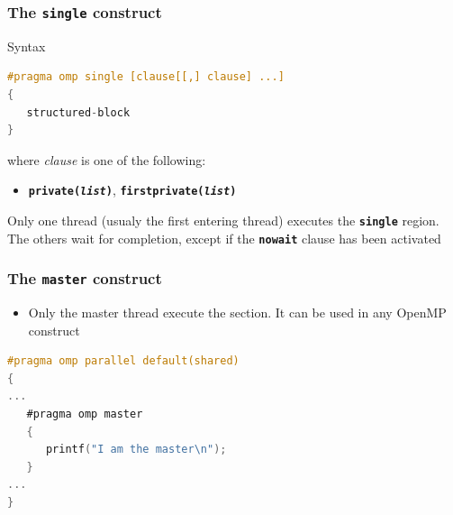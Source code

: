 \begin{frame}[containsverbatim]
\frametitle{The \texttt{single} construct}

\begin{exampleblock}{Syntax}
\begin{lstlisting}[language=C,frame=lines]
#pragma omp single [clause[[,] clause] ...]
{
   structured-block
}
\end{lstlisting}
where \textit{clause} is one of the following:
\begin{itemize}
\item{\textbf{\texttt{private(\textit{list})}}, \textbf{\texttt{firstprivate(\textit{list})}}}
\end{itemize}
\end{exampleblock}

\begin{block}{}
Only one thread (usualy the first entering thread) executes the \textbf{\texttt{single}} region. The others wait for completion, except if the \textbf{\texttt{nowait}} clause has been activated
\end{block}

\end{frame}


\begin{frame}[containsverbatim]
\frametitle{The \texttt{master} construct}

\begin{itemize}
        \item{Only the master thread execute the section. It can be used in any OpenMP construct}
\end{itemize}

\begin{lstlisting}[language=C,frame=lines]
#pragma omp parallel default(shared)
{
...
   #pragma omp master
   {
      printf("I am the master\n");
   }
...
}
\end{lstlisting}

\end{frame}


